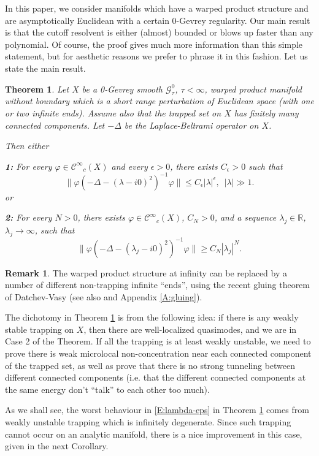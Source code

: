 \documentclass[twoside, final]{amsart}
\newtheorem{theorem}{Theorem}
\theoremstyle{definition}
\newtheorem{remark}[proposition]{Remark}
\numberwithin{equation}{section}
\begin{document}
In this paper, we consider manifolds which have a warped product
structure and are 
asymptotically Euclidean with a certain 0-Gevrey regularity.  Our
main result is that the cutoff resolvent is either (almost) bounded
or blows up faster than any polynomial.  Of course, the proof gives
much more information than this simple statement, but for aesthetic
reasons we prefer to phrase it in this fashion.  Let us state the main
result.

\begin{theorem}
\label{T:dichotomy}
Let $X$ be a 0-Gevrey smooth ${\mathcal{G}}^0_\tau$, $\tau < \infty$, warped product manifold without boundary
which is a short range perturbation of Euclidean space (with one or
two infinite ends).  Assume also that the trapped set on $X$ has
finitely many connected components.  Let $-\Delta$ be the
Laplace-Beltrami operator on $X$.  

Then either

{\bf 1:}  For every ${\varphi} \in {{\mathcal C}^\infty}_c(X)$ and every $\epsilon>0$, there exists $C_\epsilon
>0$ such that
\begin{equation}
\label{E:lambda-eps}
\| {\varphi} (-\Delta - (\lambda - i0)^2)^{-1} {\varphi} \| {\leqslant} C_\epsilon | \lambda |^{\epsilon},
\,\,\, | \lambda | \gg 1.
\end{equation}
or

{\bf 2:}  For every $N>0$, there exists ${\varphi} \in {{\mathcal C}^\infty}_c(X)$, $C_N >0$, and a sequence $\lambda_j \in
{{\mathbb R}}$, $\lambda_j \to \infty$, such that 
\begin{equation}
\label{E:lambda-bup-1}
\| {\varphi} (-\Delta - (\lambda_j - i0)^2)^{-1} {\varphi} \| {\geqslant} C_N |\lambda_j|^N.
\end{equation}

\end{theorem}

\begin{remark}
The warped product structure at infinity can be replaced by a number
of different non-trapping infinite ``ends'', using the recent gluing
theorem of Datchev-Vasy \cite{DaVa-gluing} (see also \cite{Chr-disp-1}
and Appendix \ref{A:gluing}).  

The dichotomy in Theorem
\ref{T:dichotomy} is from the following idea: if there is any weakly
stable trapping on $X$, then there are well-localized quasimodes, and
we are in Case 2 of the Theorem.  If all the trapping is at least
weakly unstable, we need to prove there is weak microlocal
non-concentration near each connected component of the trapped set, as
well as prove that there is no strong tunneling between different
connected components (i.e. that the different connected components at
the same energy don't ``talk'' to each other too much).

As we shall see, the worst behaviour in \eqref{E:lambda-eps} in Theorem \ref{T:dichotomy}
comes from weakly unstable trapping which is infinitely
degenerate.  Since such trapping cannot occur on an analytic manifold,
there is a nice improvement in this case, given in the next Corollary.  

\end{remark}
\end{document}
